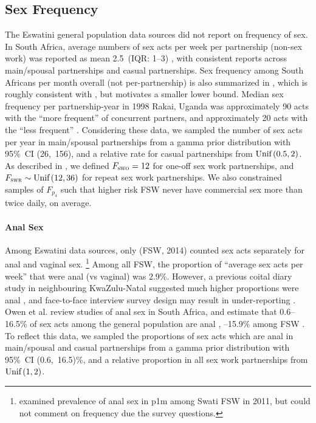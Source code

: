 \subsection{Sex Frequency}\label{mod.par.fsex}
The Eswatini general population data sources \cite{SDHS2006,SHIMS1,SHIMS2}
did not report on frequency of sex. %
In South Africa, average numbers of sex acts per week per partnership (non-sex work)
was reported as mean 2.5~(IQR: 1--3) \cite{Delva2013},
with consistent reports across main/spousal partnerships and casual partnerships.
Sex frequency among South Africans per month overall (not per-partnership)
is also summarized in \cite[Figure~3.15]{Shisana2005},
which is roughly consistent with \cite{Delva2013}, but motivates a smaller lower bound.
Median sex frequency per partnership-year in 1998 Rakai, Uganda was
approximately 90 acts with the ``more frequent'' of concurrent partners, and
approximately 20 acts with the ``less frequent'' \cite{Morris2010}.
Considering these data,
we sampled the number of sex acts per year in main/spousal partnerships
from a gamma prior distribution with 95\%~CI (26,~156),
and a relative rate for casual partnerships from $\textnormal{Unif}\,(0.5,2)$.
As described in ,
we defined $F_{\textsc{swo}} = 12$ for one-off sex work partnerships,
and $F_{\textsc{swr}} \sim \textnormal{Unif}\,(12,36)$ for repeat sex work partnerships.
We also constrained samples of $F_{p_{4}}$ such that
higher risk FSW never have commercial sex more than twice daily, on average.
\paragraph{Anal Sex}
Among Eswatini data sources, only \cite{EswKP2014} (FSW, 2014)
counted sex acts separately for anal and vaginal sex.%
\footnote{\citet{Owen2020esw} examined prevalence of anal sex in p1m among Swati FSW in 2011,
  but could not comment on frequency due the survey questions.}
Among all FSW, the proportion of ``average sex acts per week'' that were anal (vs vaginal) was 2.9\%.
However, a previous coital diary study in neighbouring KwaZulu-Natal suggested
much higher proportions were anal \cite{Ramjee1999},
and face-to-face interview survey design may result in under-reporting \cite{Owen2020sr}.
Owen et al. review studies of anal sex in South Africa, and estimate that
0.6--16.5\% of sex acts among the general population are anal \cite{Owen2017}, --15.9\% among FSW \cite{Owen2020sr}.
To reflect this data, we sampled the proportions of sex acts which are anal
in main/spousal and casual partnerships from
a gamma prior distribution with 95\%~CI (0.6,~16.5)\%,
and a relative proportion in all sex work partnerships from $\textnormal{Unif}\,(1,2)$.
